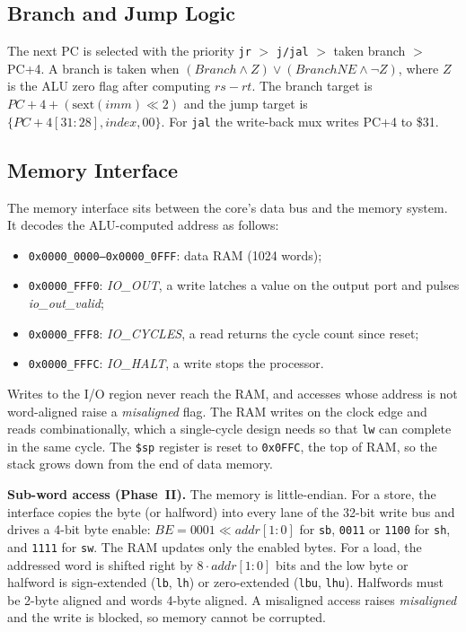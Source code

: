 \documentclass[conference]{IEEEtran}
\begin{document}
\subsection{Branch and Jump Logic}
The next PC is selected with the priority \texttt{jr} $>$ \texttt{j/jal} $>$ taken branch $>$ PC+4. A branch is taken when $(Branch \land Z) \lor (BranchNE \land \lnot Z)$, where $Z$ is the ALU zero flag after computing $rs - rt$. The branch target is $PC{+}4 + (\mathrm{sext}(imm) \ll 2)$ and the jump target is $\{PC{+}4[31{:}28], index, 00\}$. For \texttt{jal} the write-back mux writes PC+4 to \$31.

\subsection{Memory Interface}
The memory interface sits between the core's data bus and the memory system. It decodes the ALU-computed address as follows:
\begin{itemize}
\item \texttt{0x0000\_0000--0x0000\_0FFF}: data RAM (1024 words);
\item \texttt{0x0000\_FFF0}: \textit{IO\_OUT}, a write latches a value on the output port and pulses \textit{io\_out\_valid};
\item \texttt{0x0000\_FFF8}: \textit{IO\_CYCLES}, a read returns the cycle count since reset;
\item \texttt{0x0000\_FFFC}: \textit{IO\_HALT}, a write stops the processor.
\end{itemize}
Writes to the I/O region never reach the RAM, and accesses whose address is not word-aligned raise a \textit{misaligned} flag. The RAM writes on the clock edge and reads combinationally, which a single-cycle design needs so that \texttt{lw} can complete in the same cycle. The \texttt{\$sp} register is reset to \texttt{0x0FFC}, the top of RAM, so the stack grows down from the end of data memory.

\textbf{Sub-word access (Phase~II).} The memory is little-endian. For a store, the interface copies the byte (or halfword) into every lane of the 32-bit write bus and drives a 4-bit byte enable: $BE = 0001 \ll addr[1{:}0]$ for \texttt{sb}, \texttt{0011} or \texttt{1100} for \texttt{sh}, and \texttt{1111} for \texttt{sw}. The RAM updates only the enabled bytes. For a load, the addressed word is shifted right by $8 \cdot addr[1{:}0]$ bits and the low byte or halfword is sign-extended (\texttt{lb}, \texttt{lh}) or zero-extended (\texttt{lbu}, \texttt{lhu}). Halfwords must be 2-byte aligned and words 4-byte aligned. A misaligned access raises \textit{misaligned} and the write is blocked, so memory cannot be corrupted.
\end{document}
